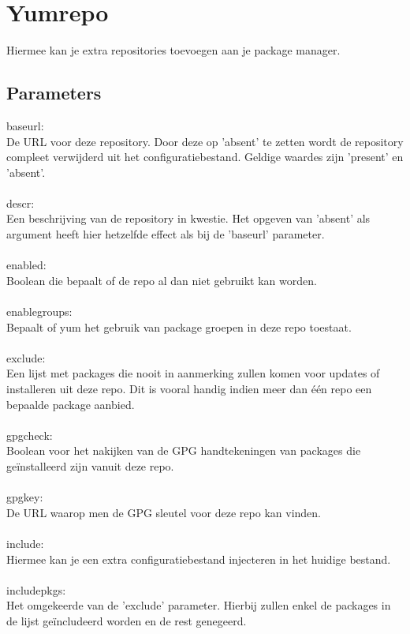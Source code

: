 \section{Yumrepo}

Hiermee kan je extra repositories toevoegen aan je package manager.

\subsection{Parameters}

baseurl:\\
De URL voor deze repository. Door deze op 'absent' te zetten wordt de repository compleet verwijderd uit het configuratiebestand. Geldige waardes zijn 'present' en 'absent'.\\\\
%
descr:\\
Een beschrijving van de repository in kwestie. Het opgeven van 'absent' als argument heeft hier hetzelfde effect als bij de 'baseurl' parameter.\\\\
%
enabled:\\
Boolean die bepaalt of de repo al dan niet gebruikt kan worden.\\\\
%
enablegroups:\\
Bepaalt of yum het gebruik van package groepen in deze repo toestaat.\\\\
%
exclude:\\
Een lijst met packages die nooit in aanmerking zullen komen voor updates of installeren uit deze repo. Dit is vooral handig indien meer dan \'e\'en repo een bepaalde package aanbied.\\\\
%
gpgcheck:\\
Boolean voor het nakijken van de GPG handtekeningen van packages die ge\"installeerd zijn vanuit deze repo.\\\\
%
gpgkey:\\
De URL waarop men de GPG sleutel voor deze repo kan vinden.\\\\
%
include:\\
Hiermee kan je een extra configuratiebestand injecteren in het huidige bestand.\\\\
%
includepkgs:\\
Het omgekeerde van de 'exclude' parameter. Hierbij zullen enkel de packages in de lijst ge\"includeerd worden en de rest genegeerd.\\\\
